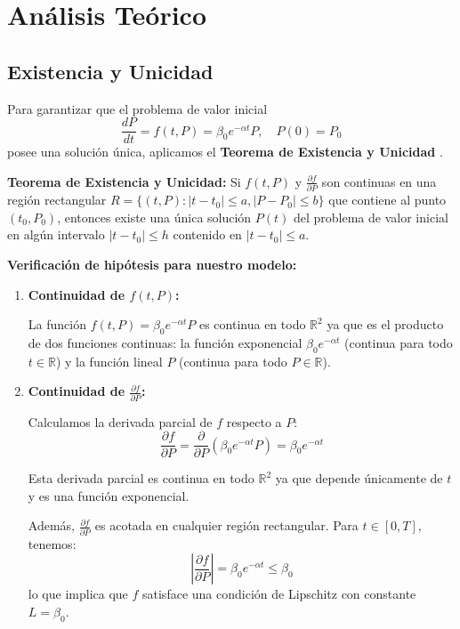 \documentclass[a4paper,10pt,twocolumn]{article}
\begin{document}
\section{Análisis Teórico}\label{sec:teoria}


\subsection{Existencia y Unicidad}\label{subsec:existencia}

Para garantizar que el problema de valor inicial
\[\frac{dP}{dt} = f(t,P) = \beta_0 e^{-\alpha t} P, \quad P(0) = P_0\]
posee una solución única, aplicamos el \textbf{Teorema de Existencia y Unicidad} \cite{edwards}.

\textbf{Teorema de Existencia y Unicidad:} Si $f(t,P)$ y $\frac{\partial f}{\partial P}$ son continuas en una región rectangular $R = \{(t,P): |t-t_0| \leq a, |P-P_0| \leq b\}$ que contiene al punto $(t_0, P_0)$, entonces existe una única solución $P(t)$ del problema de valor inicial en algún intervalo $|t-t_0| \leq h$ contenido en $|t-t_0| \leq a$.

\textbf{Verificación de hipótesis para nuestro modelo:}

\begin{enumerate}
    \item \textbf{Continuidad de $f(t,P)$:}

    La función $f(t,P) = \beta_0 e^{-\alpha t} P$ es continua en todo $\mathbb{R}^2$ ya que es el producto de dos funciones continuas: la función exponencial $\beta_0 e^{-\alpha t}$ (continua para todo $t \in \mathbb{R}$) y la función lineal $P$ (continua para todo $P \in \mathbb{R}$).

    \item \textbf{Continuidad de $\frac{\partial f}{\partial P}$:}

    Calculamos la derivada parcial de $f$ respecto a $P$:
    \[\frac{\partial f}{\partial P} = \frac{\partial}{\partial P}\left(\beta_0 e^{-\alpha t} P\right) = \beta_0 e^{-\alpha t}\]

    Esta derivada parcial es continua en todo $\mathbb{R}^2$ ya que depende únicamente de $t$ y es una función exponencial.

    Además, $\frac{\partial f}{\partial P}$ es acotada en cualquier región rectangular. Para $t \in [0, T]$, tenemos:
    \[\left|\frac{\partial f}{\partial P}\right| = \beta_0 e^{-\alpha t} \leq \beta_0\]
    lo que implica que $f$ satisface una condición de Lipschitz con constante $L = \beta_0$.
\end{enumerate}
\end{document}
